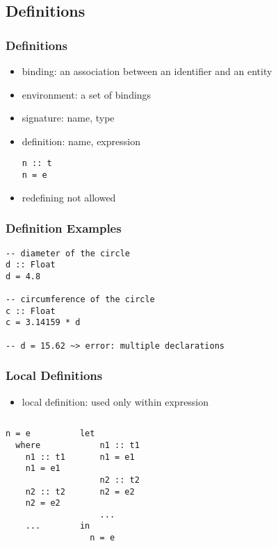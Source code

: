 \documentclass[dvipsnames]{beamer}
\theoremstyle{plain}
\begin{document}
\subsection{Definitions}

\begin{frame}[fragile]
  \frametitle{Definitions}

  \begin{itemize}
    \item \alert{binding}: an association between an identifier and an entity
    \item \alert{environment}: a set of bindings

    \pause
    \bigskip
    \item signature: name, type
    \item definition: name, expression
    \begin{lstlisting}[style=syntax]
n :: t
n = e
    \end{lstlisting}

    \medskip
    \item redefining not allowed
  \end{itemize}
\end{frame}

\begin{frame}[fragile]
  \frametitle{Definition Examples}

  \begin{lstlisting}
-- diameter of the circle
d :: Float
d = 4.8

-- circumference of the circle
c :: Float
c = 3.14159 * d

-- d = 15.62 ~> error: multiple declarations
  \end{lstlisting}
\end{frame}

\begin{frame}[fragile]
  \frametitle{Local Definitions}

  \begin{itemize}
    \item local definition: used only within expression
  \end{itemize}

  \begin{columns}[t]
    \begin{lstlisting}[style=syntax]
n = e
  where
    n1 :: t1
    n1 = e1

    n2 :: t2
    n2 = e2

    ...
    \end{lstlisting}

    \begin{lstlisting}[style=syntax]
let
    n1 :: t1
    n1 = e1

    n2 :: t2
    n2 = e2

    ...
in
  n = e
    \end{lstlisting}
  \end{columns}
\end{frame}
\end{document}
